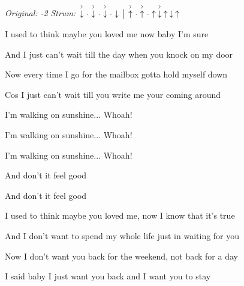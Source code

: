 \begin{song}


\begin{headerbox}
\RaiseBoxWithAccents
\textit{Original: -2} \quad
\textit{Strum:} $\AccentDown\Miss\AccentDown\Miss\AccentDown\Miss\Down \Separator \AccentUp\Miss\AccentUp\Miss\Up\AccentDown\Up\Down\Up$ \quad
\end{headerbox}

\begin{hchordbox}
\end{hchordbox}

\bigskip

I used to think maybe you loved me now baby I'm sure    \par
And I just can’t wait till the day when you knock on my door    \par
Now every time I go for the mailbox gotta hold myself down    \par
Cos I just can’t wait till you write me your coming around    \par

\bigskip

I'm walking on sunshine... Whoah! \par
I'm walking on sunshine... Whoah! \par
I'm walking on sunshine... Whoah! \par
And don't it feel good    \par
And don’t it feel good    \par

\bigskip

I used to think maybe you loved me, now I know that it's true    \par
And I don't want to spend my whole life just in waiting for you    \par
Now I don't want you back for the weekend, not back for a day    \par
I said baby I just want you back and I want you to stay    \par


\end{song}
